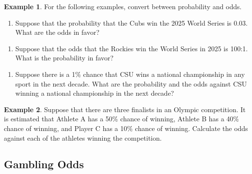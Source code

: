 \documentclass[
  11pt,
]{book}
\providecommand{\tightlist}{%
  \setlength{\itemsep}{0pt}\setlength{\parskip}{0pt}}
\theoremstyle{definition}
\theoremstyle{definition}
\newtheorem{example}{Example}[chapter]
\theoremstyle{definition}
\theoremstyle{definition}
\theoremstyle{remark}
\begin{document}
\begin{example}
For the following examples, convert between probability and odds.
\end{example}

\begin{enumerate}
\def\labelenumi{(\alph{enumi})}
\tightlist
\item
  Suppose that the probability that the Cubs win the 2025 World Series is 0.03. What are the odds in favor?\\
\end{enumerate}

\hfill\break
\hfill\break
\hfill\break

\begin{enumerate}
\def\labelenumi{(\alph{enumi})}
\setcounter{enumi}{1}
\tightlist
\item
  Suppose that the odds that the Rockies win the World Series in 2025 is 100:1. What is the probability in favor?\\
\end{enumerate}

\hfill\break
\hfill\break
\hfill\break

\begin{enumerate}
\def\labelenumi{(\alph{enumi})}
\setcounter{enumi}{2}
\tightlist
\item
  Suppose there is a 1\% chance that CSU wins a national championship in any sport in the next decade. What are the probability and the odds against CSU winning a national championship in the next decade?\\
\end{enumerate}

\hfill\break
\hfill\break
\hfill\break

\begin{example}
Suppose that there are three finalists in an Olympic competition. It is estimated that Athlete A has a 50\% chance of winning, Athlete B has a 40\% chance of winning, and Player C has a 10\% chance of winning. Calculate the odds against each of the athletes winning the competition.
\end{example}

\hfill\break
\hfill\break
\hfill\break
\hfill\break
\hfill\break

\hypertarget{gambling-odds}{%
\subsection{Gambling Odds}\label{gambling-odds}}
\end{document}
